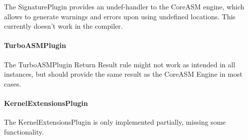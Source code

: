 \documentclass{article}
\newcommand{\CoreASM}{{\sffamily CoreASM}\xspace}
\begin{document}
The SignaturePlugin provides an undef-handler to the \CoreASM engine, which allows to generate warnings and
errors upon using undefined locations.
This currently doesn't work in the compiler.

\paragraph{TurboASMPlugin}

The TurboASMPlugin Return Result rule might not work as intended in all instances, but should provide the same
result as the \CoreASM Engine in most cases.

\paragraph{KernelExtensionsPlugin}

The KernelExtensionsPlugin is only implemented partially, missing some functionality.

\printindex
\end{document}
